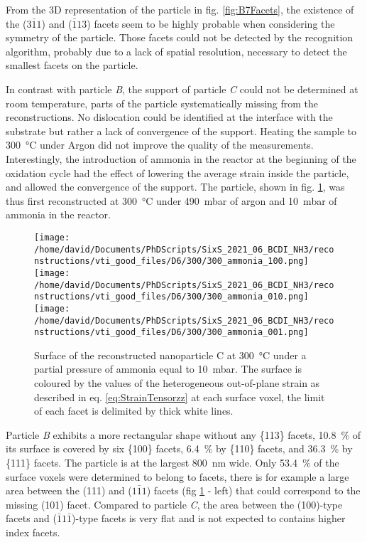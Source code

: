 From the 3D representation of the particle in fig. \ref{fig:B7Facets}, the existence of the ($3\bar{1}1$) and ($\bar{1}13$) facets seem to be highly probable when considering the symmetry of the particle.
Those facets could not be detected by the recognition algorithm, probably due to a lack of spatial resolution, necessary to detect the smallest facets on the particle.

In contrast with particle \textit{B}, the support of particle \textit{C} could not be determined at room temperature, parts of the particle systematically missing from the reconstructions.
No dislocation could be identified at the interface with the substrate but rather a lack of convergence of the support.
Heating the sample to \qty{300}{\degreeCelsius} under Argon did not improve the quality of the measurements.
Interestingly, the introduction of ammonia in the reactor at the beginning of the oxidation cycle had the effect of lowering the average strain inside the particle, and allowed the convergence of the support.
The particle, shown in fig. \ref{fig:D6Facets}, was thus first reconstructed at \qty{300}{\degreeCelsius} under \qty{490}{\milli\bar} of argon and \qty{10}{\milli\bar} of ammonia in the reactor.

\begin{figure}[!htb]
    \centering
    \texttt{[image: /home/david/Documents/PhDScripts/SixS\_2021\_06\_BCDI\_NH3/reconstructions/vti\_good\_files/D6/300/300\_ammonia\_100.png]}
    \texttt{[image: /home/david/Documents/PhDScripts/SixS\_2021\_06\_BCDI\_NH3/reconstructions/vti\_good\_files/D6/300/300\_ammonia\_010.png]}
    \texttt{[image: /home/david/Documents/PhDScripts/SixS\_2021\_06\_BCDI\_NH3/reconstructions/vti\_good\_files/D6/300/300\_ammonia\_001.png]}
    \caption{
        Surface of the reconstructed nanoparticle C at \qty{300}{\degreeCelsius} under a partial pressure of ammonia equal to \qty{10}{\milli\bar}.
        The surface is coloured by the values of the heterogeneous out-of-plane strain as described in eq. \ref{eq:StrainTensorzz} at each surface voxel, the limit of each facet is delimited by thick white lines.
    }
    \label{fig:D6Facets}
\end{figure}

Particle \textit{B} exhibits a more rectangular shape without any \{113\} facets, \qty{10.8}{\percent} of its surface is covered by six \{100\} facets, \qty{6.4}{\percent} by \{110\} facets, and \qty{36.3}{\percent} by \{111\} facets.
The particle is at the largest \qty{800}{\nm} wide.
Only \qty{53.4}{\percent} of the surface voxels were determined to belong to facets, there is for example a large area between the (111) and ($1\bar{1}1$) facets (fig \ref{fig:D6Facets} - left) that could correspond to the missing (101) facet.
Compared to particle \textit{C}, the area between the (100)-type facets and ($\bar{1}1\bar{1}$)-type facets is very flat and is not expected to contains higher index facets.


